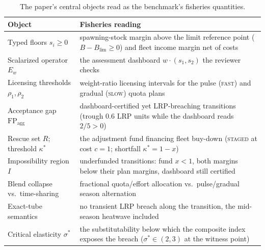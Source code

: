 \documentclass[preprint,11pt,authoryear]{elsarticle}
\theoremstyle{remark}
\newcommand{\FP}{\mathrm{FP}_{\mathrm{agg}}}
\newcommand{\act}[1]{\textsc{#1}}
\begin{document}
\begin{table}[!htbp]
\centering\small
\caption{The paper's central objects read as the benchmark's fisheries quantities.}
\label{tab:fisheries}
\begin{tabularx}{\textwidth}{@{}>{\raggedright\arraybackslash}p{}X@{}}
\toprule
Object & Fisheries reading \\
\midrule
Typed floors $s_i\ge0$ & spawning-stock margin above the limit reference point ($B-B_{\mathrm{lim}}\ge0$) and fleet income margin net of costs \\
Scalarized operator $E_w$ & the assessment dashboard $w\cdot(s_1,s_2)$ the reviewer checks \\
Licensing thresholds $\rho_1,\rho_2$ & weight-ratio licensing intervals for the pulse (\act{fast}) and gradual (\act{slow}) quota plans \\
Acceptance gap $\FP$ & dashboard-certified yet LRP-breaching transitions (trough $0.6$ LRP units while the dashboard reads $2/5>0$) \\
Rescue set $R$; threshold $\kappa^*$ & the adjustment fund financing fleet buy-down (\act{staged} at cost $c=1$; shortfall $\kappa^*=1-x$) \\
Impossibility region $I$ & underfunded transitions: fund $x<1$, both margins below their plan margins, dashboard still certified \\
Blend collapse vs.\ time-sharing & fractional quota/effort allocation vs.\ pulse/gradual season alternation \\
Exact-tube semantics & no transient LRP breach along the transition, the mid-season heatwave included \\
Critical elasticity $\sigma^*$ & the substitutability below which the composite index exposes the breach ($\sigma^*\in(2,3)$ at the witness point) \\
\bottomrule
\end{tabularx}
\end{table}
\end{document}
